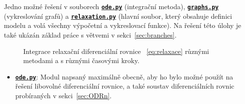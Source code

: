 \documentclass[a4paper,11pt,twoside]{article}
\def\ghfile#1#2{\textnormal{\textbf{\texttt{\href{https://github.com/PavelStransky/PCInPhysics2021/blob/main/#1#2}{#2}}}}}
\theoremstyle{red}
\theoremstyle{green}
\begin{document}
\setcounter{solution}{1}
\begin{solution}
    \label{sol:ODR1}
    Jedno možné řešení v souborech \ghfile{python/ode/}{ode.py} (integrační metoda), \ghfile{python/ode/}{graphs.py} (vykreslování grafů) a \ghfile{python/ode/}{relaxation.py} (hlavní soubor, který obsahuje definici modelu a volá všechny výpočetní a vykreslovací funkce).
    Na řešení této úlohy je také ukázán základ práce s větvemi v sekci~\ref{sec:branches}.
    
    \begin{figure}[!htbp]
        \begin{subfigure}{0.49\linewidth}
            \centering{}
        \end{subfigure}
        \hfill
        \begin{subfigure}{0.49\linewidth}
            \centering{}
        \end{subfigure}
        \begin{subfigure}{0.49\linewidth}
            \centering{}
        \end{subfigure}
        \hfill
        \begin{subfigure}{0.49\linewidth}
            \centering{}
        \end{subfigure}
        \caption{
            \protect\small
            Integrace relaxační diferenciální rovnice ~\eqref{eq:relaxace} různými metodami a s různými časovými kroky.
        }	
        \label{fig:relaxace}
    \end{figure}

    \begin{itemize}
    \item \ghfile{python/ode/}{ode.py}: 
        Modul napsaný maximálně obecně, aby ho bylo možné použít na řešení libovolné diferenciální rovnice, a také soustav diferenciálních rovnic probíraných v sekci~\ref{sec:ODRn}.
        

\end{itemize}
\end{solution}
\end{document}
